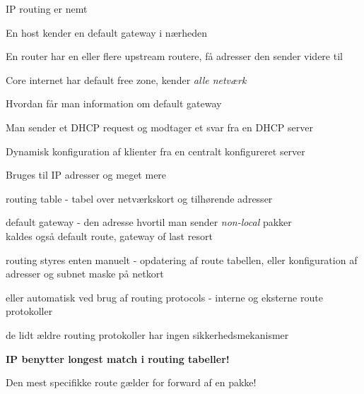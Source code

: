\documentclass[Screen16to9,17pt,footrule]{foils}
\begin{document}


\begin{list1}
\item IP routing er nemt
\item En host kender en default gateway i nærheden
\item En router har en eller flere upstream routere, få adresser den sender videre til
\item Core internet har default free zone, kender \emph{alle netværk}
\end{list1}





\begin{list1}
\item Hvordan får man information om default gateway
\item Man sender et DHCP request og modtager et svar fra en DHCP server
\item Dynamisk konfiguration af klienter fra en centralt konfigureret server
\item Bruges til IP adresser og meget mere
\end{list1}




\begin{list1}
  \item routing table - tabel over netværkskort og tilhørende adresser
\item default gateway - den adresse hvortil man sender
  \emph{non-local} pakker\\kaldes også default route, gateway of last
  resort
\item routing styres enten manuelt - opdatering af route tabellen,
  eller konfiguration af adresser og subnet maske på netkort
\item eller automatisk ved brug af routing protocols - interne og
  eksterne route protokoller
\item de lidt ældre routing protokoller har ingen sikkerhedsmekanismer
\item {\bf IP benytter longest match i routing tabeller!}
\item Den mest specifikke route gælder for forward af en pakke!
\end{list1}


\end{document}
